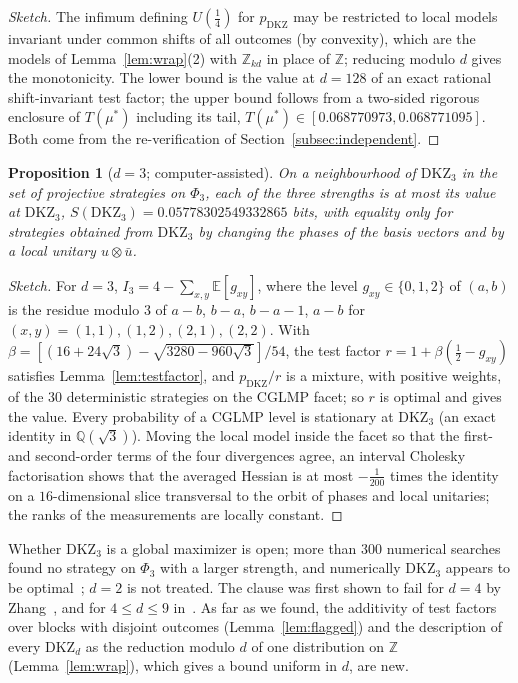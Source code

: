 \documentclass[11pt]{article}
\newtheorem{proposition}[lemma]{Proposition}
\theoremstyle{remark}
\numberwithin{equation}{section}
\newcommand{\Z}{\mathbb{Z}}
\newcommand{\E}{\mathbb{E}}
\newcommand{\DKZ}{\mathrm{DKZ}}
\begin{document}
\begin{proof}[Sketch]
The infimum defining $U(\frac14)$ for $p_{\DKZ}$ may be restricted to local models invariant under common shifts of all
outcomes (by convexity), which are the models of Lemma~\ref{lem:wrap}(2) with $\Z_{kd}$ in place of $\Z$; reducing modulo
$d$ gives the monotonicity. The lower bound is the value at $d=128$ of an exact rational shift-invariant test factor; the
upper bound follows from a two-sided rigorous enclosure of $T(\mu^*)$ including its tail,
$T(\mu^*)\in[0.068770973,0.068771095]$. Both come from the re-verification of Section~\ref{subsec:independent}.
\end{proof}

\begin{proposition}[$d=3$; computer-assisted]\label{prop:kl3}
On a neighbourhood of $\DKZ_3$ in the set of projective strategies on $\Phi_3$, each of the three strengths is at most its
value at $\DKZ_3$, $S(\DKZ_3)=0.05778302549332865$ bits, with equality only for strategies obtained from $\DKZ_3$ by
changing the phases of the basis vectors and by a local unitary $u\otimes\bar u$.
\end{proposition}

\begin{proof}[Sketch]
For $d=3$, $I_3=4-\sum_{x,y}\E[g_{xy}]$, where the level $g_{xy}\in\{0,1,2\}$ of $(a,b)$ is the residue modulo $3$ of
$a-b$, $b-a$, $b-a-1$, $a-b$ for $(x,y)=(1,1),(1,2),(2,1),(2,2)$. With
$\beta=[(16+24\sqrt3)-\sqrt{3280-960\sqrt3}]/54$, the test factor $r=1+\beta(\frac12-g_{xy})$ satisfies
Lemma~\ref{lem:testfactor}, and $p_{\DKZ}/r$ is a mixture, with positive weights, of the $30$ deterministic strategies on
the CGLMP facet; so $r$ is optimal and gives the value. Every probability of a CGLMP level is stationary at $\DKZ_3$ (an
exact identity in $\mathbb Q(\sqrt3)$). Moving the local model inside the facet so that the first- and second-order terms
of the four divergences agree, an interval Cholesky factorisation shows that the averaged Hessian is at most
$-\frac1{200}$ times the identity on a $16$-dimensional slice transversal to the orbit of phases and local unitaries; the
ranks of the measurements are locally constant.
\end{proof}

Whether $\DKZ_3$ is a global maximizer is open; more than $300$ numerical searches found no strategy on $\Phi_3$ with a
larger strength, and numerically $\DKZ_3$ appears to be optimal~\cite{vDGG,AGG}; $d=2$ is not treated. The clause was
first shown to fail for $d=4$ by Zhang~\cite{Zhang}, and for $4\le d\le9$ in~\cite{repoCGLMP}. As far as we found, the
additivity of test factors over blocks with disjoint outcomes
(Lemma~\ref{lem:flagged}) and the description of every $\DKZ_d$ as the reduction modulo $d$ of one distribution on $\Z$
(Lemma~\ref{lem:wrap}), which gives a bound uniform in $d$, are new.
\end{document}

